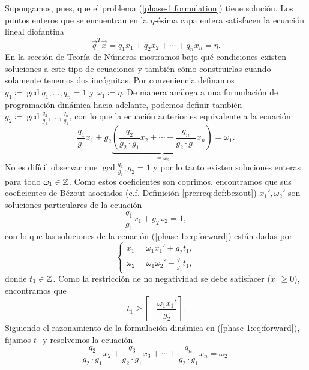 Supongamos, pues, que el problema (\ref{phase-1:formulation}) tiene solución. Los puntos enteros que
se encuentran en la $\eta$-ésima capa entera satisfacen la ecuación lineal diofantina
\begin{equation}
	\label{phase-1:eq:dioph}
	\vec{q}^T\vec{x} = q_1x_1 + q_2x_2 + \cdots + q_nx_n = \eta.
\end{equation}
En la sección de Teoría de Números mostramos bajo qué condiciones existen soluciones a este tipo de
ecuaciones y también cómo construirlas cuando solamente tenemos dos incógnitas. Por conveniencia
definamos $g_1 \coloneq \gcd{q_1, \ldots, q_n} = 1$ y $\omega_1 \coloneq \eta$. De manera análoga a
una formulación de programación dinámica hacia adelante, podemos definir también
$g_2 \coloneq \gcd{\frac{q_2}{g_1}, \ldots, \frac{q_n}{g_1}}$, con lo que la ecuación anterior es
equivalente a la ecuación
\begin{equation}
	\label{phase-1:eq:forward}
	\frac{q_1}{g_1}x_1 + g_2
		\underbrace{
		\left(\frac{q_2}{g_2 \cdot g_1}x_2 + \cdots + \frac{q_n}{g_2 \cdot g_1}x_n\right)}_{\coloneq
		\omega_2}
	= \omega_1.
\end{equation}
No es difícil observar que $\gcd{\frac{q_1}{g_1}, g_2} = 1$ y por lo tanto existen soluciones
enteras para todo $\omega_1 \in \mathbb{Z}$. Como estos coeficientes son coprimos, encontramos que sus
coeficientes de Bézout asociados (c.f. Definición \ref{prerreq:def:bezout}) $x_1', \omega_2'$ son
soluciones particulares de la ecuación
\begin{equation*}
	\frac{q_1}{g_1}x_1 + g_2\omega_2 = 1,
\end{equation*}
con lo que las soluciones de la ecuación (\ref{phase-1:eq:forward}) están dadas por
\begin{equation*}
	\begin{cases}
		x_1 = \omega_1x_1' + g_2t_1, \\
		\omega_2 = \omega_1\omega_2' - \frac{q_1}{g_1}t_1,
	\end{cases}
\end{equation*}
donde $t_1 \in \mathbb{Z}$. Como la restricción de no negatividad se debe satisfacer ($x_1 \geq 0$),
encontramos que
\begin{equation*}
	t_1 \geq \left\lceil -\frac{\omega_1x_1'}{g_2} \right\rceil.
\end{equation*}
Siguiendo el razonamiento de la formulación dinámica en (\ref{phase-1:eq:forward}), fijamos $t_1$ y
resolvemos la ecuación
\begin{equation*}
	\frac{q_2}{g_2 \cdot g_1}x_2 +
	\frac{q_3}{g_2 \cdot g_1}x_3 +
	\cdots +
	\frac{q_n}{g_2 \cdot g_1}x_n
	= \omega_2.
\end{equation*}
